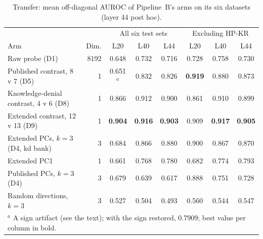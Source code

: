 \begin{table}[t]
\centering
\footnotesize
\caption{Transfer: mean off-diagonal AUROC of Pipeline~B's arms on its six datasets (layer 44 post hoc).}
\label{tab:r-transfer}
\begin{tabular}{p{50mm}rcccccc}
\hline
 & & \multicolumn{3}{c}{All six test sets} & \multicolumn{3}{c}{Excluding HP-KR} \\
Arm & Dim. & L20 & L40 & L44 & L20 & L40 & L44 \\
\hline
Raw probe (D1) & 8192 & 0.648 & 0.732 & 0.716 & 0.728 & 0.758 & 0.730 \\
\hline
Published contrast, 8 v 7 (D5) & 1 & 0.651$^{a}$ & 0.832 & 0.826 & \textbf{0.919} & 0.880 & 0.873 \\
Knowledge-denial contrast, 4 v 6 (D8) & 1 & 0.866 & 0.912 & 0.900 & 0.861 & 0.910 & 0.899 \\
Extended contrast, 12 v 13 (D9) & 1 & \textbf{0.904} & \textbf{0.916} & \textbf{0.903} & 0.909 & \textbf{0.917} & \textbf{0.905} \\
\hline
Extended PCs, $k=3$ (D4, kd bank) & 3 & 0.684 & 0.866 & 0.880 & 0.900 & 0.867 & 0.870 \\
Extended PC1 & 1 & 0.661 & 0.768 & 0.780 & 0.682 & 0.774 & 0.793 \\
Published PCs, $k=3$ (D4) & 3 & 0.679 & 0.639 & 0.617 & 0.888 & 0.751 & 0.728 \\
Random directions, $k=3$ & 3 & 0.527 & 0.504 & 0.493 & 0.560 & 0.544 & 0.547 \\
\hline
\multicolumn{8}{p{140mm}}{$^{a}$ A sign artifact (see the text); with the sign restored, 0.7909; best value per column in bold.} \\
\end{tabular}
\end{table}

